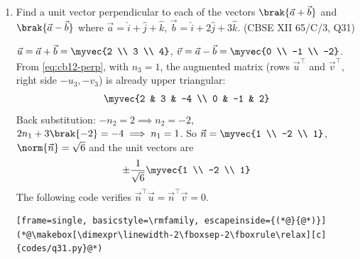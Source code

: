 \begin{enumerate}[label=\thesubsection.\arabic*, ref=\thesubsection.\theenumi,itemsep=0pt]
\textbf{OR:} The planes are $\vec{n}_1 = \myvec{1 \\ 3 \\ 0}$, $c_1 = -6$ and $\vec{n}_2 = \myvec{3 \\ -1 \\ -4}$, $c_2 = 0$. From \eqref{eq:cb12-family}, $\vec{n} = \myvec{1+3\lambda \\ 3-\lambda \\ -4\lambda}$, $c = -6$ and the distance condition $\frac{6}{\norm{\vec{n}}} = 1$ gives
\begin{align}
g\brak{\lambda} = \norm{\vec{n}}^2 - 36 = 26\lambda^2 - 26 = 0
\end{align}
The Newton-Raphson iteration \eqref{eq:cb12-nr}, $\lambda_{n+1} = \lambda_n - \frac{g\brak{\lambda_n}}{52\lambda_n}$, gives $\lambda = \pm 1$ and the planes
\begin{align}
4x + 2y - 4z + 6 = 0, \quad -2x + 4y + 4z + 6 = 0
\end{align}
i.e. $2x + y - 2z + 3 = 0$ and $x - 2y - 2z - 3 = 0$. The following code verifies both parts.
\begin{lstlisting}[frame=single, basicstyle=\rmfamily, escapeinside={(*@}{@*)}]
(*@\makebox[\dimexpr\linewidth-2\fboxsep-2\fboxrule\relax][c]{codes/q30.py}@*)
\end{lstlisting}

\item Find a unit vector perpendicular to each of the vectors $\brak{\vec{a}+\vec{b}}$ and $\brak{\vec{a}-\vec{b}}$ where $\vec{a} = \hat{i} + \hat{j} + \hat{k}$, $\vec{b} = \hat{i} + 2\hat{j} + 3\hat{k}$.
\hfill (CBSE XII 65/C/3, Q31)

\solution $\vec{u} = \vec{a}+\vec{b} = \myvec{2 \\ 3 \\ 4}$, $\vec{v} = \vec{a}-\vec{b} = \myvec{0 \\ -1 \\ -2}$. From \ref{eq:cb12-perp}, with $n_3 = 1$,
the augmented matrix (rows $\vec{u}^{\top}$ and $\vec{v}^{\top}$, right side $-u_3, -v_3$) is already upper triangular:
\begin{align}
\myvec{2 & 3 & -4 \\ 0 & -1 & 2}
\end{align}
Back substitution: $-n_2 = 2 \implies n_2 = -2$, $2n_1 + 3\brak{-2} = -4 \implies n_1 = 1$. So $\vec{n} = \myvec{1 \\ -2 \\ 1}$, $\norm{\vec{n}} = \sqrt{6}$ and the unit vectors are
\begin{align}
\pm\frac{1}{\sqrt{6}}\myvec{1 \\ -2 \\ 1}
\end{align}
The following code verifies $\vec{n}^{\top}\vec{u} = \vec{n}^{\top}\vec{v} = 0$.
\begin{lstlisting}[frame=single, basicstyle=\rmfamily, escapeinside={(*@}{@*)}]
(*@\makebox[\dimexpr\linewidth-2\fboxsep-2\fboxrule\relax][c]{codes/q31.py}@*)
\end{lstlisting}


\end{enumerate}
